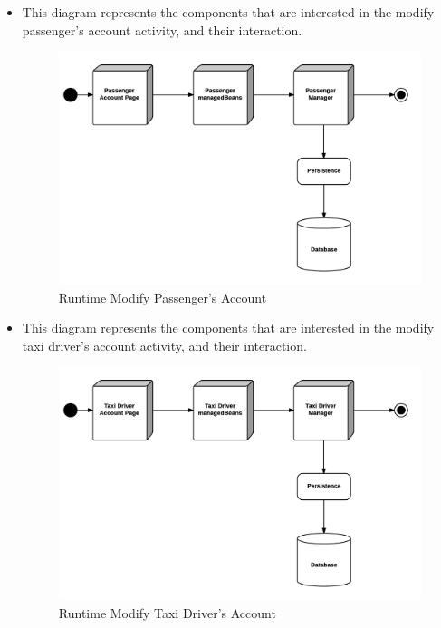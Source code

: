 \begin{itemize}
	\item This diagram represents the components that are interested in the modify passenger's account activity, and their interaction.
	\begin{figure}[htbp]
	\centering
	\includegraphics[width=\textwidth]{cpt/img/RuntimeModifyPageView}
	\caption{Runtime Modify Passenger's Account}
	\end{figure}
	\clearpage
	
	\item This diagram represents the components that are interested in the modify taxi driver's account activity, and their interaction.
	\begin{figure}[htbp]
	\centering
	\includegraphics[width=\textwidth]{cpt/img/RuntimeModifyPageTaxidriverView}
	\caption{Runtime Modify Taxi Driver's Account}
	\end{figure}
	\clearpage
	

\end{itemize}
